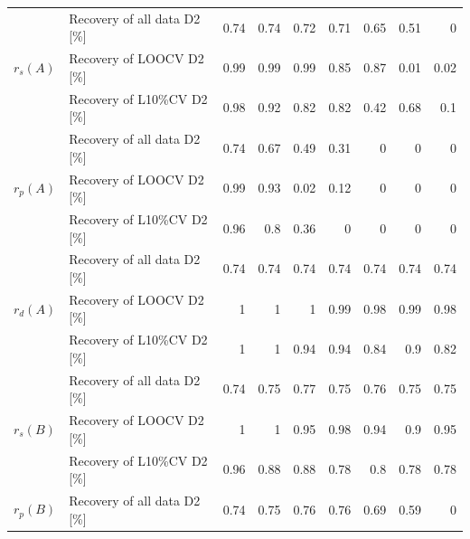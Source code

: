 \documentclass[11pt,oneside,czech,american]{book} %
\theoremstyle{plain}
\theoremstyle{definition}
\begin{document}
\begin{table}[H]
\begin{tabular}{llrrrrrrr}
	\hline
	\multirow{3}{*}{$r_s(A)$} & Recovery of all data D2 [\%] & 0.74          & 0.74          & 0.72          & 0.71         & 0.65          & 0.51          & 0              \\
	& Recovery of LOOCV D2 [\%]    & 0.99          & 0.99          & 0.99          & 0.85         & 0.87          & 0.01          & 0.02           \\
	& Recovery of L10\%CV D2 [\%]  & 0.98          & 0.92          & 0.82          & 0.82         & 0.42          & 0.68          & 0.1            \\ 
	\hline
	\multirow{3}{*}{$r_p(A)$} & Recovery of all data D2 [\%] & 0.74          & 0.67          & 0.49          & 0.31         & 0             & 0             & 0              \\
	& Recovery of LOOCV D2 [\%]    & 0.99          & 0.93          & 0.02          & 0.12         & 0             & 0             & 0              \\
	& Recovery of L10\%CV D2 [\%]  & 0.96          & 0.8           & 0.36          & 0            & 0             & 0             & 0              \\ 
	\hline
	\multirow{3}{*}{$r_d(A)$} & Recovery of all data D2 [\%] & 0.74          & 0.74          & 0.74          & 0.74         & 0.74          & 0.74          & 0.74           \\
	& Recovery of LOOCV D2 [\%]    & 1             & 1             & 1             & 0.99         & 0.98          & 0.99          & 0.98           \\
	& Recovery of L10\%CV D2 [\%]  & 1             & 1             & 0.94          & 0.94         & 0.84          & 0.9           & 0.82           \\ 
	\hline
	\multirow{3}{*}{$r_s(B)$} & Recovery of all data D2 [\%] & 0.74          & 0.75          & 0.77          & 0.75         & 0.76          & 0.75          & 0.75           \\
	& Recovery of LOOCV D2 [\%]    & 1             & 1             & 0.95          & 0.98         & 0.94          & 0.9           & 0.95           \\
	& Recovery of L10\%CV D2 [\%]  & 0.96          & 0.88          & 0.88          & 0.78         & 0.8           & 0.78          & 0.78           \\ 
	\hline
	\multirow{3}{*}{$r_p(B)$} & Recovery of all data D2 [\%] & 0.74          & 0.75          & 0.76          & 0.76         & 0.69          & 0.59          & 0              \\

\end{tabular}
\end{table}
\end{document}
